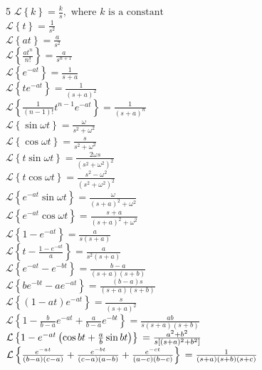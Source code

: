 \documentclass[10pt,landscape,a4paper]{article}
\begin{document}
\begin{multicols*}{5}
  \(\mathcal{L} \left\{k \right\} = \frac{k}{s}, \text{ where } k \text{ is a constant}\) \\
  \(\mathcal{L} \left\{t \right\} = \frac{1}{s^2}\) \\
  \(\mathcal{L} \left\{at \right\} = \frac{a}{s^2}\) \\
  \(\mathcal{L} \left\{\frac{at^n}{n!} \right\} = \frac{a}{s^{n+1}}\) \\
  \(\mathcal{L} \left\{e^{-at} \right\} = \frac{1}{s + a}\) \\
  \(\mathcal{L} \left\{te^{-at} \right\} = \frac{1}{(s + a)^2}\) \\
  \(\mathcal{L} \left\{\frac{1}{(n - 1)!} t^{n - 1}e^{-at} \right\} = \frac{1}{(s + a)^n}\) \\
  \(\mathcal{L} \left\{\sin \omega t \right\} = \frac{\omega}{s^2 + \omega^2}\) \\
  \(\mathcal{L} \left\{\cos \omega t \right\} = \frac{s}{s^2 + \omega^2}\) \\
  \(\mathcal{L} \left\{t \sin \omega t \right\} = \frac{2 \omega s}{(s^2 + \omega^2)^2}\) \\
  \(\mathcal{L} \left\{t \cos \omega t \right\} = \frac{s^2 - \omega^2}{(s^2 + \omega^2)^2}\) \\
  \(\mathcal{L} \left\{e^{-at} \sin \omega t \right\} = \frac{\omega}{(s + a)^2 + \omega^2}\) \\
  \(\mathcal{L} \left\{e^{-at} \cos \omega t \right\} = \frac{s + a}{(s + a)^2 + \omega^2}\) \\
  \(\mathcal{L} \left\{1 - e^{-at} \right\} = \frac{a}{s(s + a)}\) \\
  \(\mathcal{L} \left\{t - \frac{1 -e^{-at}}{a} \right\} = \frac{a}{s^2(s + a)}\) \\
  \(\mathcal{L} \left\{e^{-at} - e^{-bt} \right\} = \frac{b - a}{(s + a) (s + b)}\) \\
  \(\mathcal{L} \left\{be^{-bt} - ae^{-at} \right\} = \frac{(b - a)s}{(s + a) (s + b)}\) \\
  \(\mathcal{L} \left\{(1 - at) e^{-at} \right\} = \frac{s}{(s + a)^2}\) \\
  \(\mathcal{L} \left\{1 - \frac{b}{b - a} e^{- at} + \frac{a}{b - a} e^{-bt} \right\} = \frac{ab}{s (s + a) (s + b)}\) \\
  \(\mathcal{L} \left\{1 - e^{-at} \left(\cos bt + \frac{a}{b} \sin bt \right) \right\} \\ = \frac{a^2 + b^2}{s[(s + a)^2 + b^2]}\) \\
  \(\mathcal{L} \left\{\frac{e^{-at}}{(b - a) (c - a)} + \frac{e^{-bt}}{(c - a) (a - b)} + \frac{e^{-ct}}{(a - c) (b - c)} \right\} \\ = \frac{1}{(s + a) (s + b) (s + c)}\) \\

\end{multicols*}
\end{document}
